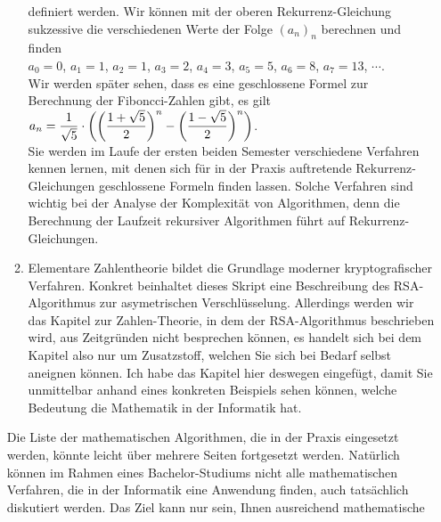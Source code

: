 \begin{enumerate}
\begin{enumerate}
            definiert werden.  Wir können mit der oberen Rekurrenz-Gleichung sukzessive die verschiedenen
            Werte der Folge $(a_n)_n$ berechnen und finden 
            \\[0.2cm]
            \hspace*{1.3cm}
            $a_0 = 0$, $a_1 = 1$, $a_2 = 1$, $a_3 = 2$, $a_4 = 3$, $a_5 = 5$, $a_6 = 8$, $a_7 = 13$, $\cdots$.
            \\[0.2cm]
            Wir werden später sehen, dass es eine geschlossene Formel zur Berechnung der Fiboncci-Zahlen
            gibt, es gilt
            \\[0.2cm]
            \hspace*{1.3cm}
            $\displaystyle a_n = \frac{1}{\sqrt{5}} \cdot 
            \left( 
                  \biggl(\frac{1 + \sqrt{5}}{2}\biggr)^n - \biggl(\frac{1 - \sqrt{5}}{2}\biggr)^n 
            \right)
            $.
            \\[0.2cm]
            Sie werden im Laufe der ersten beiden Semester verschiedene Verfahren kennen lernen, mit
            denen sich für in der Praxis auftretende Rekurrenz-Gleichungen geschlossene Formeln
            finden lassen.  Solche Verfahren sind wichtig bei der Analyse der Komplexität von
            Algorithmen, denn die Berechnung der Laufzeit rekursiver Algorithmen führt auf
            Rekurrenz-Gleichungen.   
      \item Elementare Zahlentheorie bildet die Grundlage moderner kryptografischer Verfahren.
            Konkret beinhaltet dieses Skript eine Beschreibung des RSA-Algorithmus zur asymetrischen
            Verschlüsselung.  Allerdings werden wir das Kapitel zur Zahlen-Theorie, in dem der 
            RSA-Algorithmus beschrieben wird, aus Zeitgründen nicht besprechen können, es handelt
            sich bei dem Kapitel also nur um Zusatzstoff, welchen Sie sich bei Bedarf selbst aneignen
            können.  Ich habe das Kapitel hier deswegen eingefügt, damit Sie unmittelbar anhand
            eines konkreten Beispiels sehen können, welche Bedeutung die Mathematik in der
            Informatik hat.
      \end{enumerate}
      Die Liste der mathematischen Algorithmen, die in der Praxis eingesetzt werden, könnte leicht
      über mehrere Seiten fortgesetzt werden.  Natürlich können im Rahmen eines Bachelor-Studiums
      nicht alle mathematischen Verfahren, die in der Informatik eine Anwendung finden, auch
      tatsächlich diskutiert werden.  Das Ziel kann nur sein, Ihnen ausreichend mathematische

\end{enumerate}
